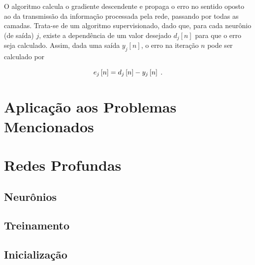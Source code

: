 O algoritmo calcula o gradiente descendente e propaga o erro no sentido oposto ao da transmissão da informação processada pela rede, passando por todas as camadas. Trata-se de um algoritmo supervisionado, dado que, para cada neurônio (de saída) $j$, existe a dependência de um valor desejado $d_{j}[n]$ para que o erro seja calculado. Assim, dada uma saída $y_{j}[n]$, o erro na iteração $n$ pode ser calculado por

\begin{equation}
    e_{j}\left[n\right] = d_{j}\left[n\right] - y_{j}\left[n\right]
    \label{eq:ann_backpropagation}
    \hspace{0.1cm}.
    \vspace{0.2cm}
\end{equation}


\section{Aplicação aos Problemas Mencionados}
\label{sec:ann_application_mentioned_problem}



\section{Redes Profundas}
\label{sec:ann_deep_networks}



\subsection{Neurônios}
\label{subsec:ann_neurons}



\subsection{Treinamento}
\label{subsec:ann_training}



\subsection{Inicialização}
\label{subsec:ann_inicialization}
